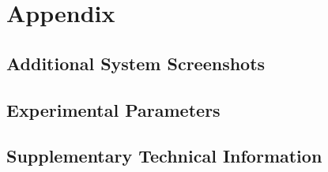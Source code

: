 \chapter{Appendix}

\section{Additional System Screenshots}

\section{Experimental Parameters}

\section{Supplementary Technical Information}